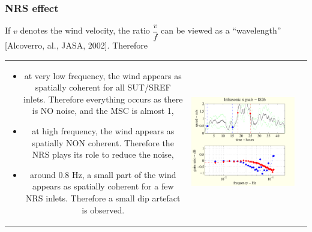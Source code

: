 \documentclass[handout,9pt]{beamer}
\begin{document}
\begin{frame}
\frametitle{NRS effect}

If $v$ denotes the wind velocity, the ratio $\dfrac{v}{f}$ can be viewed as a ``wavelength'' [Alcoverro, al., JASA,
2002]. Therefore


\begin{tabular}{clc}
\hspace{-1cm}
\begin{minipage}{6cm}
\begin{itemize}
\item
{\color{red}at very low frequency}, 
{ the wind appears as spatially coherent for all SUT/SREF inlets. Therefore everything occurs as there is NO noise, and the MSC is almost 1},
\item
{\color{red}at high frequency},  
{the wind appears as spatially NON coherent. Therefore the NRS plays its role to reduce the noise},
\item
{\color{red}around $0.8$ Hz}, 
{a small part of the wind appears as  spatially coherent for a few NRS inlets. Therefore a small dip artefact is observed}.
\end{itemize}
\end{minipage}
&
\begin{minipage}{7.5cm}
\includegraphics[scale=0.45]{twospeedster.pdf}
\end{minipage}
\end{tabular}
\end{frame}
\end{document}
